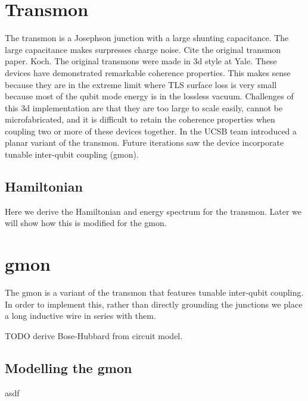 \section{Transmon}
The transmon is a Josephson junction with a large shunting capacitance.
The large capacitance makes  surpresses charge noise.
Cite the original transmon paper. Koch.
The original transmons were made in 3d style at Yale.  These devices have demonstrated remarkable coherence properties.
This makes sense because they are in the extreme limit where TLS surface loss is very small because most of the qubit mode energy is in the lossless vacuum.
Challenges of this 3d implementation are that they are too large to scale easily,
cannot be microfabricated,
and it is difficult to retain the coherence properties when coupling two or more of these devices together.
In  the UCSB team introduced a planar variant of the transmon.
Future iterations saw the device incorporate tunable inter-qubit coupling (gmon).

\subsection{Hamiltonian}
Here we derive the Hamiltonian and energy spectrum for the transmon.  Later we will show how this is modified for the gmon.

\section{gmon}
The gmon is a variant of the transmon that features tunable inter-qubit coupling.
In order to implement this, rather than directly grounding the junctions we place a long inductive wire in series with them.







TODO derive Bose-Hubbard from circuit model.
\subsection{Modelling the gmon}
asdf

